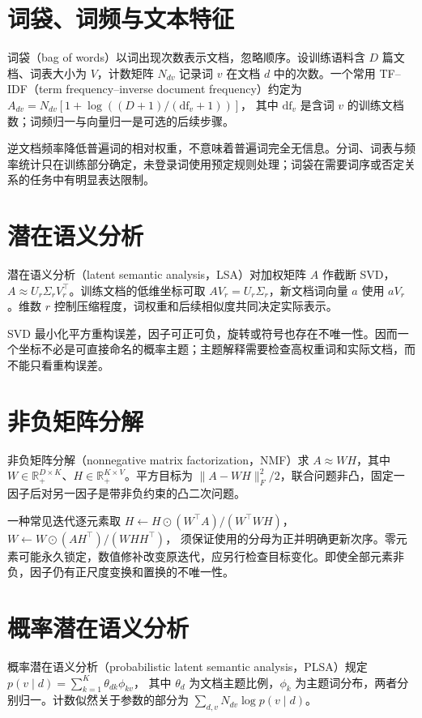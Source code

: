 \documentclass[UTF8,12pt,a4paper,fontset=fandol]{ctexbook}
\begin{document}
\section{词袋、词频与文本特征}

词袋（bag of words）以词出现次数表示文档，忽略顺序。设训练语料含 $D$ 篇文档、词表大小为 $V$，计数矩阵 $N_{dv}$ 记录词 $v$ 在文档 $d$ 中的次数。一个常用 TF--IDF（term frequency--inverse document frequency）约定为
$A_{dv}=N_{dv}[1+\log((D+1)/(\mathrm{df}_v+1))]$，
其中 $\mathrm{df}_v$ 是含词 $v$ 的训练文档数；词频归一与向量归一是可选的后续步骤。

逆文档频率降低普遍词的相对权重，不意味着普遍词完全无信息。分词、词表与频率统计只在训练部分确定，未登录词使用预定规则处理；词袋在需要词序或否定关系的任务中有明显表达限制。

\section{潜在语义分析}

潜在语义分析（latent semantic analysis，LSA）对加权矩阵 $A$ 作截断 SVD，$A\approx U_r\Sigma_rV_r^\top$。训练文档的低维坐标可取 $AV_r=U_r\Sigma_r$，新文档词向量 $a$ 使用 $aV_r$。维数 $r$ 控制压缩程度，词权重和后续相似度共同决定实际表示。

SVD 最小化平方重构误差，因子可正可负，旋转或符号也存在不唯一性。因而一个坐标不必是可直接命名的概率主题；主题解释需要检查高权重词和实际文档，而不能只看重构误差。

\section{非负矩阵分解}

非负矩阵分解（nonnegative matrix factorization，NMF）求 $A\approx WH$，其中 $W\in\mathbb R_+^{D\times K}$、$H\in\mathbb R_+^{K\times V}$。平方目标为 $\|A-WH\|_F^2/2$，联合问题非凸，固定一因子后对另一因子是带非负约束的凸二次问题。

一种常见迭代逐元素取
$H\leftarrow H\odot(W^\top A)/(W^\top WH)$，
$W\leftarrow W\odot(AH^\top)/(WHH^\top)$，
须保证使用的分母为正并明确更新次序。零元素可能永久锁定，数值修补改变原迭代，应另行检查目标变化。即使全部元素非负，因子仍有正尺度变换和置换的不唯一性。

\section{概率潜在语义分析}

概率潜在语义分析（probabilistic latent semantic analysis，PLSA）规定
$p(v\mid d)=\sum_{k=1}^K\theta_{dk}\phi_{kv}$，
其中 $\theta_d$ 为文档主题比例，$\phi_k$ 为主题词分布，两者分别归一。计数似然关于参数的部分为 $\sum_{d,v}N_{dv}\log p(v\mid d)$。
\end{document}
